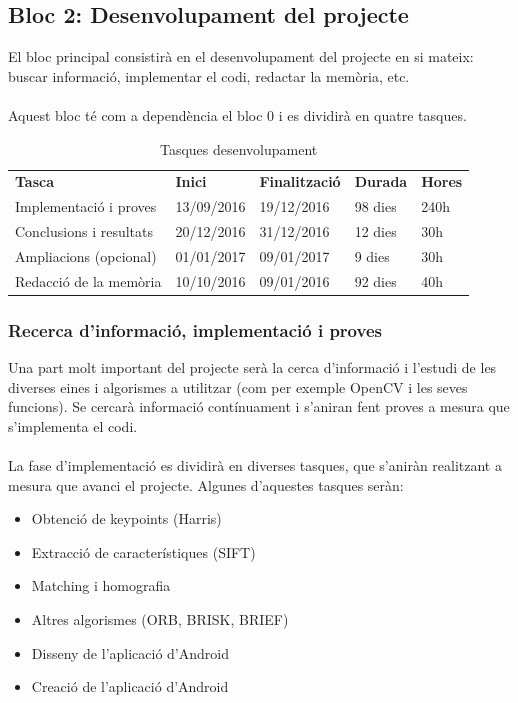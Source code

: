 	\subsection{Bloc 2: Desenvolupament del projecte}
			El bloc principal consistirà en el desenvolupament del projecte en si mateix: buscar informació, implementar el codi, redactar la memòria, etc.\\\\
			Aquest bloc té com a dependència el bloc 0 i es dividirà en quatre tasques.\\
			\begin{table}[H]
				\begin{center}
					\begin{tabular}{p{5cm} !{\vrule width -1pt}x{2.1cm} !{\vrule width -1pt}x{2.4cm} !{\vrule width -1pt}x{1.6cm} !{\vrule width -1pt}x{1.6cm}}
					\textbf{Tasca} & \textbf{Inici} & \textbf{Finalització} & \textbf{Durada} & \textbf{Hores} \\
					Implementació i proves & 13/09/2016 & 19/12/2016 & 98 dies & 240h \\
					Conclusions i resultats & 20/12/2016 & 31/12/2016 & 12 dies & 30h \\
					Ampliacions (opcional) & 01/01/2017 & 09/01/2017 & 9 dies & 30h \\
					Redacció de la memòria & 10/10/2016 & 09/01/2016 & 92 dies & 40h \\
					\end{tabular}
				\end{center}
				\caption{Tasques desenvolupament}
			\end{table}

		\subsubsection{Recerca d'informació, implementació i proves}
			Una part molt important del projecte serà la cerca d'informació i l'estudi de les diverses eines i algorismes a utilitzar (com per exemple OpenCV i les seves funcions).
			Se cercarà informació contínuament i s'aniran fent proves a mesura que s'implementa el codi.\\\\
			La fase d'implementació es dividirà en diverses tasques, que s'aniràn realitzant a mesura que avanci el projecte. Algunes d'aquestes tasques seràn:
			\begin{itemize}
				\item{Obtenció de keypoints (Harris)}
				\item{Extracció de característiques (SIFT)}
				\item{Matching i homografia}
				\item{Altres algorismes (ORB, BRISK, BRIEF)}
				\item{Disseny de l'aplicació d'Android}
				\item{Creació de l'aplicació d'Android}
			\end{itemize}
